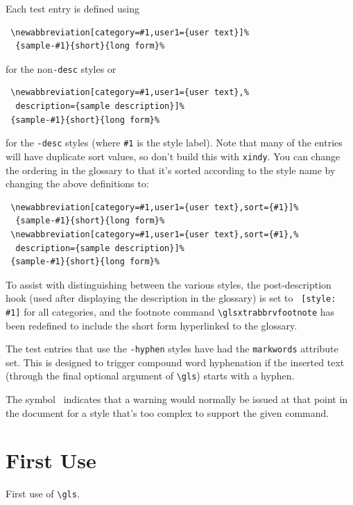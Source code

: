 \documentclass{report}
\newcommand*{\warningsym}{\textcolor{red}{\faExclamationTriangle}}
\renewcommand{\glsxtrabbrvfootnote}[2]{%
  \footnote{\glshyperlink[\glsfmtshort{#1}]{#1}: #2}%
}
\begin{document}
Each test entry is defined using 
\begin{verbatim}
 \newabbreviation[category=#1,user1={user text}]%
  {sample-#1}{short}{long form}%
\end{verbatim}
for the non\texttt{-desc} styles or
\begin{verbatim}
 \newabbreviation[category=#1,user1={user text},%
  description={sample description}]%
 {sample-#1}{short}{long form}%
\end{verbatim}
for the \texttt{-desc} styles (where \verb|#1| is the style label).
Note that many of the entries will have duplicate sort values, so
don't build this with \texttt{xindy}. You can change the ordering
in the glossary to that it's sorted according to the style name
by changing the above definitions to:
\begin{verbatim}
 \newabbreviation[category=#1,user1={user text},sort={#1}]%
  {sample-#1}{short}{long form}%
 \newabbreviation[category=#1,user1={user text},sort={#1},%
  description={sample description}]%
 {sample-#1}{short}{long form}%
\end{verbatim}

To assist with distinguishing between the various styles, 
the post-description hook (used after displaying the description in
the glossary) is set to \verb*| [style: #1]| for all categories,
and the footnote command \verb|\glsxtrabbrvfootnote| has been
redefined to include the short form hyperlinked to the glossary.

The test entries that use the \texttt{-hyphen} styles have had the
\texttt{markwords} attribute set. This is designed to trigger
compound word hyphenation if the inserted text (through the final
optional argument of \verb|\gls|) starts with a hyphen.

%
\renewcommand*{\GlossariesAbbrStyleTooComplexWarning}[2]{%
 \warningsym\marginpar{\hyperlink{warningnote}{\warningsym} too complex}}%
The symbol \warningsym\ indicates that a warning would normally be
issued at that point in the document for a style that's too complex
to support the given command.

\tableofcontents

\chapter{First Use}
First use of \verb|\gls|.

\end{document}
